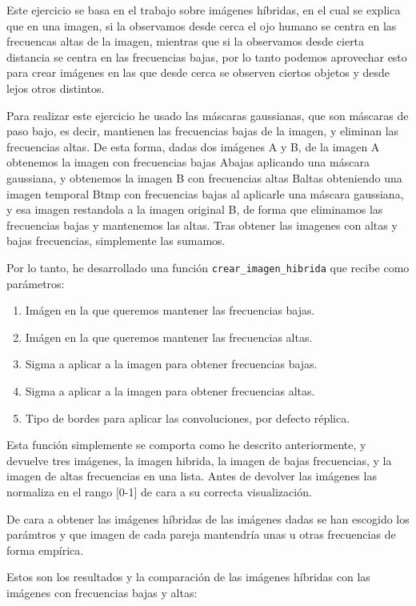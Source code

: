 \documentclass[12pt, spanish]{article}
\begin{document}
Este ejercicio se basa en el trabajo sobre imágenes híbridas\cite{img_hibridas}, en el cual se explica que en una imagen, si la observamos desde cerca el ojo humano se centra en las frecuencas altas de la imagen, mientras que si la observamos desde cierta distancia se centra en las frecuencias bajas, por lo tanto podemos aprovechar esto para crear imágenes en las que desde cerca se observen ciertos objetos y desde lejos otros distintos.


Para realizar este ejercicio he usado las máscaras gaussianas, que son máscaras de paso bajo, es decir, mantienen las frecuencias bajas de la imagen, y eliminan las frecuencias altas. De esta forma, dadas dos imágenes A y B, de la imagen A obtenemos la imagen con frecuencias bajas Abajas aplicando una máscara gaussiana, y obtenemos la imagen B con frecuencias altas Baltas obteniendo una imagen temporal Btmp con frecuencias bajas al aplicarle una máscara gaussiana, y esa imagen restandola a la imagen original B, de forma que eliminamos las frecuencias bajas y mantenemos las altas. Tras obtener las imagenes con altas y bajas frecuencias, simplemente las sumamos.


Por lo tanto, he desarrollado una función \texttt{crear\_imagen\_hibrida} que recibe como parámetros:

\begin{enumerate}
	\item Imágen en la que queremos mantener las frecuencias bajas.
	\item Imágen en la que queremos mantener las frecuencias altas.
	\item Sigma a aplicar a la imagen para obtener frecuencias bajas.
	\item Sigma a aplicar a la imagen para obtener frecuencias altas.
	\item Tipo de bordes para aplicar las convoluciones, por defecto réplica.
\end{enumerate}

Esta función simplemente se comporta como he descrito anteriormente, y devuelve tres imágenes, la imagen hibrida, la imagen de bajas frecuencias, y la imagen de altas frecuencias en una lista. Antes de devolver las imágenes las normaliza en el rango [0-1] de cara a su correcta visualización.

De cara a obtener las imágenes híbridas de las imágenes dadas se han escogido los parámtros y que imagen de cada pareja mantendría unas u otras frecuencias de forma empírica.

Estos son los resultados y la comparación de las imágenes híbridas con las imágenes con frecuencias bajas y altas:
\end{document}
